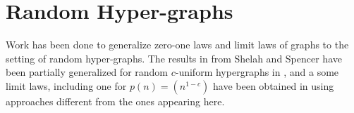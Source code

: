 \documentclass[11pt,notitlepage,a4paper]{article}
\theoremstyle{definition}
\newtheorem{definition}{Definition}[section]
\newcommand{\clist}{\mathfrak{c}_{1}, \cdots, \mathfrak{c}_m}
\newcommand{\morph}[1]{\stackrel{#1}{\simeq}}
\begin{document}
%
%
%
%
%
%
\section{Random Hyper-graphs}

Work has been done to generalize zero-one laws and limit laws of graphs to the
setting of random hyper-graphs. The results in \cite{shelah1988zero} from Shelah
and Spencer have been partially generalized for random $c$-uniform hypergraphs
in \cite{zeroonehyper}, and a some limit laws, including one for $p(n)=(n^{1-c})$
have been obtained in \cite{salvadorbrasil} using approaches different
from the ones appearing here.   
\end{document}
